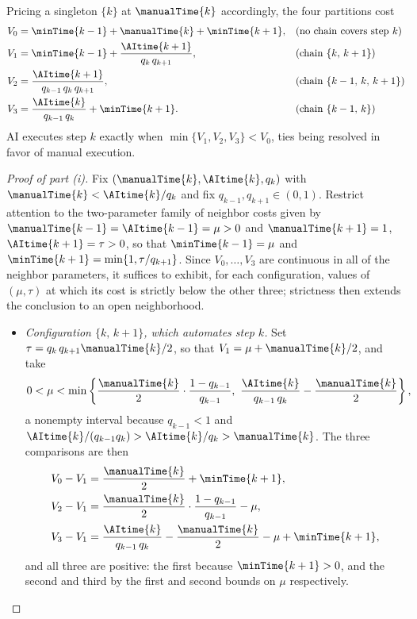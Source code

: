 Pricing a singleton $\{k\}$ at $\manualTime{k}$ accordingly, the four partitions cost
\begin{align*}
V_0 &= \minTime{k-1} + \manualTime{k} + \minTime{k+1}, && \text{(no chain covers step $k$)} \\
V_1 &= \minTime{k-1} + \frac{\AItime{k+1}}{q_k\, q_{k+1}}, && \text{(chain $\{k,\, k+1\}$)} \\
V_2 &= \frac{\AItime{k+1}}{q_{k-1}\, q_k\, q_{k+1}}, && \text{(chain $\{k-1,\, k,\, k+1\}$)} \\
V_3 &= \frac{\AItime{k}}{q_{k-1}\, q_k} + \minTime{k+1}. && \text{(chain $\{k-1,\, k\}$)}
\end{align*}
AI executes step $k$ exactly when $\min\{V_1, V_2, V_3\} < V_0$, ties being resolved in favor of manual execution.

\begin{proof}[Proof of part (i)]
Fix $(\manualTime{k}, \AItime{k}, q_k)$ with $\manualTime{k} < \AItime{k}/q_k$ and fix $q_{k-1}, q_{k+1} \in (0,1)$.
Restrict attention to the two-parameter family of neighbor costs given by $\manualTime{k-1} = \AItime{k-1} = \mu > 0$ and $\manualTime{k+1} = 1$, $\AItime{k+1} = \tau > 0$, so that $\minTime{k-1} = \mu$ and $\minTime{k+1} = \min\{1, \tau/q_{k+1}\}$.
Since $V_0, \dotsc, V_3$ are continuous in all of the neighbor parameters, it suffices to exhibit, for each configuration, values of $(\mu, \tau)$ at which its cost is strictly below the other three; strictness then extends the conclusion to an open neighborhood.

\begin{itemize}
\item \emph{Configuration $\{k,\, k+1\}$, which automates step $k$.}
Set $\tau = q_k\, q_{k+1} \manualTime{k}/2$, so that $V_1 = \mu + \manualTime{k}/2$, and take
\[ 0 < \mu < \min\left\{ \frac{\manualTime{k}}{2}\cdot\frac{1-q_{k-1}}{q_{k-1}},\ \frac{\AItime{k}}{q_{k-1}\, q_k} - \frac{\manualTime{k}}{2} \right\}, \]
a nonempty interval because $q_{k-1} < 1$ and $\AItime{k}/(q_{k-1} q_k) > \AItime{k}/q_k > \manualTime{k}$.
The three comparisons are then
\begin{align*}
V_0 - V_1 &= \frac{\manualTime{k}}{2} + \minTime{k+1}, \\
V_2 - V_1 &= \frac{\manualTime{k}}{2}\cdot\frac{1-q_{k-1}}{q_{k-1}} - \mu, \\
V_3 - V_1 &= \frac{\AItime{k}}{q_{k-1}\, q_k} - \frac{\manualTime{k}}{2} - \mu + \minTime{k+1},
\end{align*}
and all three are positive: the first because $\minTime{k+1} > 0$, and the second and third by the first and second bounds on $\mu$ respectively.


\end{itemize}
\end{proof}
